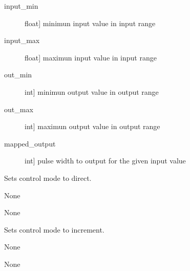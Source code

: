 \documentclass[letterpaper,10pt,english]{sphinxmanual}
\begin{document}
\begin{fulllineitems}
\begin{fulllineitems}
\begin{description}
\item[{input\_min}] \leavevmode{[}float{]}
\sphinxAtStartPar
minimun input value in input range

\item[{input\_max}] \leavevmode{[}float{]}
\sphinxAtStartPar
maximun input value in input range

\item[{out\_min}] \leavevmode{[}int{]}
\sphinxAtStartPar
minimun output value in output range

\item[{out\_max}] \leavevmode{[}int{]}
\sphinxAtStartPar
maximun output value in output range

\end{description}
\begin{description}
\item[{mapped\_output}] \leavevmode{[}int{]}
\sphinxAtStartPar
pulse width to output for the given input value

\end{description}

\end{fulllineitems}


\begin{fulllineitems}
\label{\detokenize{base:OutputObject.OutputObject.set_control_direct}}
\sphinxAtStartPar
Sets control mode to direct.

\sphinxAtStartPar
None

\sphinxAtStartPar
None

\end{fulllineitems}


\begin{fulllineitems}
\label{\detokenize{base:OutputObject.OutputObject.set_control_increment}}
\sphinxAtStartPar
Sets control mode to increment.

\sphinxAtStartPar
None

\sphinxAtStartPar
None

\end{fulllineitems}


\end{fulllineitems}
\end{document}
